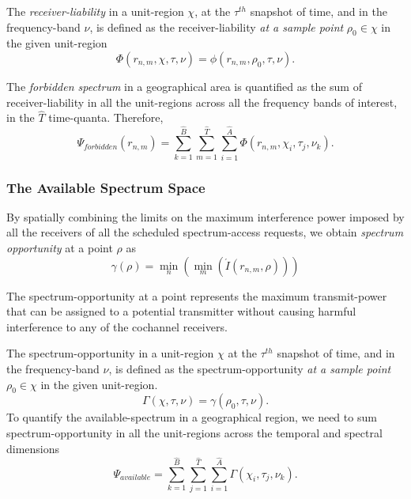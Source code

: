 \documentclass[12pt, draftclsnofoot, onecolumn]{IEEEtran}
\begin{document}
The \textit{receiver-liability} in a unit-region $\chi$, at the ${\tau}^{th}$ snapshot of time, and in the frequency-band $\nu$,  is defined as the receiver-liability \textit{at a sample point} $\rho_0 \in \chi$ in the given unit-region 
\begin{equation}
\label{eq:spfb}
{\Phi}(r_{n,m}, \chi, \tau, \nu) = \phi(r_{n,m}, \rho_0, \tau, \nu) . \end{equation}

The \textit{forbidden spectrum} in a geographical area is quantified as the sum of receiver-liability in all the unit-regions across all the frequency bands of interest, in the $\hat{T}$ time-quanta. Therefore, 
\begin{equation}
\label{eq:agspfb}
\Psi_{forbidden}(r_{n,m}) = \sum_{k=1}^{\hat{B}} \sum_{m=1}^{\hat{T}} \sum_{i=1}^{\hat{A}} {\Phi}(r_{n,m}, \chi_i, \tau_j, \nu_k) .
\end{equation}

\subsubsection{The Available Spectrum Space}

By spatially combining the limits on the maximum interference power imposed by all the receivers of all the scheduled spectrum-access requests, we obtain \textit{spectrum opportunity} at a point $\rho$ as
\begin{equation}
\gamma(\rho)	= \min_n (\min_m (\acute{I}(r_{n,m}, \rho)))
\end{equation}

The spectrum-opportunity at a point represents the maximum transmit-power that can be assigned to a potential transmitter without causing harmful interference to any of the cochannel receivers.

The spectrum-opportunity in a unit-region $\chi$ at the ${\tau}^{th}$ snapshot of time, and in the frequency-band $\nu$, is defined as the spectrum-opportunity \textit{at a sample point} $\rho_0 \in \chi$ in the given unit-region. 
\begin{equation}
\label{eq:urspop}
{\Gamma}(\chi, \tau, \nu) = \gamma(\rho_0, \tau, \nu) .\end{equation}
To quantify the available-spectrum in a geographical region, we need to sum spectrum-opportunity in all the unit-regions across the temporal and spectral dimensions
\begin{equation}
\label{eq:agspav}
\Psi_{available} = \sum_{k=1}^{\hat{B}} \sum_{j=1}^{\hat{T}} \sum_{i=1}^{\hat{A}} {\Gamma}(\chi_i, \tau_j, \nu_k) .
\end{equation}
\end{document}
